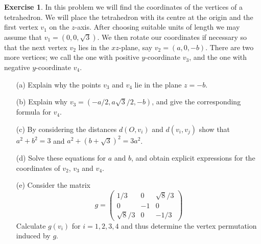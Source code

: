 \documentclass{amsart}
\renewcommand{\:}{\colon}
\newcommand{\bsm}       {\left(\begin{smallmatrix}}
\newcommand{\esm}       {\end{smallmatrix}\right)}
\theoremstyle{definition}
\newtheorem{exercise}{Exercise}
\begin{document}
\begin{exercise}
 In this problem we will find the coordinates of the vertices of a
 tetrahedron.  We will place the tetrahedron with its centre at the
 origin and the first vertex $v_1$ on the $z$-axis.  After choosing
 suitable units of length we may assume that $v_1=(0,0,\sqrt{3})$.  We
 then rotate our coordinates if necessary so that the next vertex
 $v_2$ lies in the $xz$-plane, say $v_2=(a,0,-b)$.  There are two more
 vertices; we call the one with positive $y$-coordinate $v_3$, and the
 one with negative $y$-coordinate $v_4$.
 \begin{itemize}
 \item[(a)] Explain why the points $v_3$ and $v_4$ lie in the plane
  $z=-b$.
 \item[(b)] Explain why $v_3=(-a/2,a\sqrt{3}/2,-b)$, and give the
  corresponding formula for $v_4$.
 \item[(c)] By considering the distances $d(O,v_i)$ and $d(v_i,v_j)$
  show that $a^2+b^2=3$ and $a^2+(b+\sqrt{3})^2=3a^2$.
 \item[(d)] Solve these equations for $a$ and $b$, and obtain explicit
  expressions for the coordinates of $v_2$, $v_3$ and $v_4$.
 \item[(e)] Consider the matrix
  \[ g = \bsm 1/3        &  0 & \sqrt{8}/3 \\
              0          & -1 & 0          \\
              \sqrt{8}/3 & 0  & -1/3 \esm
  \]
  Calculate $g(v_i)$ for $i=1,2,3,4$ and thus determine the vertex
  permutation induced by $g$.
 \end{itemize}
\end{exercise}
\end{document}
